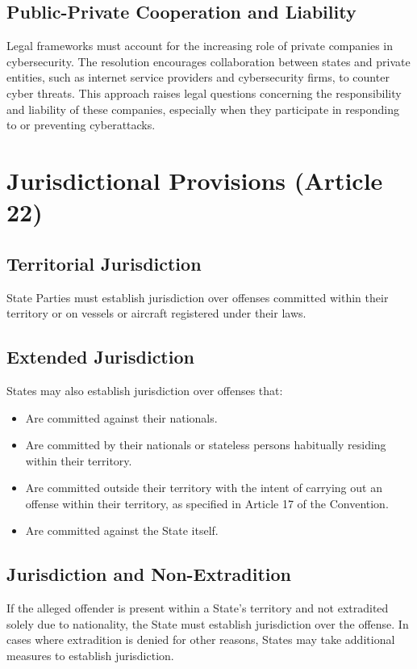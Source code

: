 \subsection{Public-Private Cooperation and Liability}
Legal frameworks must account for the increasing role of private
companies in cybersecurity. The resolution encourages collaboration
between states and private entities, such as internet service
providers and cybersecurity firms, to counter cyber threats. This
approach raises legal questions concerning the responsibility and
liability of these companies, especially when they participate in
responding to or preventing cyberattacks.

\section{Jurisdictional Provisions (Article 22)}

\subsection{Territorial Jurisdiction}
State Parties must establish jurisdiction over offenses committed
within their territory or on vessels or aircraft registered under
their laws.

\subsection{Extended Jurisdiction}
States may also establish jurisdiction over offenses that:
\begin{itemize}
  \item Are committed against their nationals.
  \item Are committed by their nationals or stateless persons
    habitually residing within their territory.
  \item Are committed outside their territory with the intent of
    carrying out an offense within their territory, as specified in
    Article 17 of the Convention.
  \item Are committed against the State itself.
\end{itemize}

\subsection{Jurisdiction and Non-Extradition}
If the alleged offender is present within a State's territory and not
extradited solely due to nationality, the State must establish
jurisdiction over the offense. In cases where extradition is denied
for other reasons, States may take additional measures to establish
jurisdiction.

